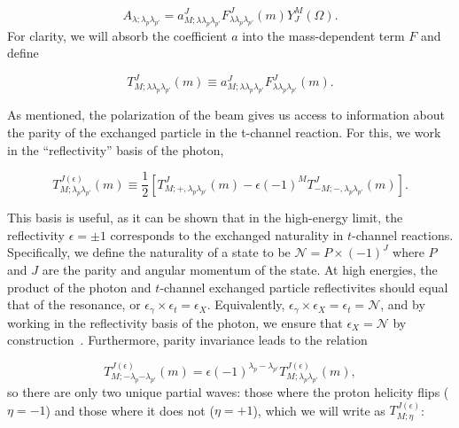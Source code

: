 \begin{equation}
  A_{\lambda;\lambda_p\lambda_{p'}} = a^J_{M;\lambda\lambda_p\lambda_{p'}} F^J_{\lambda\lambda_p\lambda_{p'}}(m) Y_J^M(\Omega).
\end{equation}
For clarity, we will absorb the coefficient $a$ into the mass-dependent term $F$ and define

\begin{equation}
  T^{J}_{M;\lambda\lambda_p\lambda_{p'}}(m) \equiv a^J_{M;\lambda\lambda_p\lambda_{p'}} F^J_{\lambda\lambda_p\lambda_{p'}}(m).
  \label{eq:amplitude-definition}
\end{equation}

As mentioned, the polarization of the beam gives us access to information about the parity of the exchanged particle in the t-channel reaction. For this, we work in the ``reflectivity'' basis of the photon,

\begin{equation}
  T^{J(\epsilon)}_{M;\lambda_p\lambda_{p'}}(m) \equiv \frac{1}{2} \left[T^J_{M;+,\lambda_p\lambda_{p'}}(m) - \epsilon(-1)^M T^J_{-M;-,\lambda_p\lambda_{p'}}(m)\right].
  \label{eq:reflectivity-amplitude}
\end{equation}

This basis is useful, as it can be shown that in the high-energy limit, the reflectivity $\epsilon=\pm 1$ corresponds to the exchanged naturality in $t$-channel reactions. Specifically, we define the naturality of a state to be $\mathcal{N} = P \times (-1)^{J}$ where $P$ and $J$ are the parity and angular momentum of the state. At high energies, the product of the photon and $t$-channel exchanged particle reflectivites should equal that of the resonance, or $\epsilon_{\gamma} \times \epsilon_{t} = \epsilon_{X}$. Equivalently, $\epsilon_{\gamma} \times \epsilon_{X} = \epsilon_{t} = \mathcal{N}$, and by working in the reflectivity basis of the photon, we ensure that $\epsilon_{X} = \mathcal{N}$ by construction~\cite{Salgado2023}. Furthermore, parity invariance leads to the relation

\begin{equation}
  T^{J(\epsilon)}_{M;-\lambda_p{-\lambda_{p'}}}(m) = \epsilon(-1)^{\lambda_p-\lambda_{p'}}T^{J(\epsilon)}_{M;\lambda_p\lambda_{p'}}(m),
  \label{eq:nucleon-parity-invariance}
\end{equation}
so there are only two unique partial waves: those where the proton helicity flips ($\eta = -1$) and those where it does not ($\eta = +1$), which we will write as $T^{J(\epsilon)}_{M;\eta}$:

